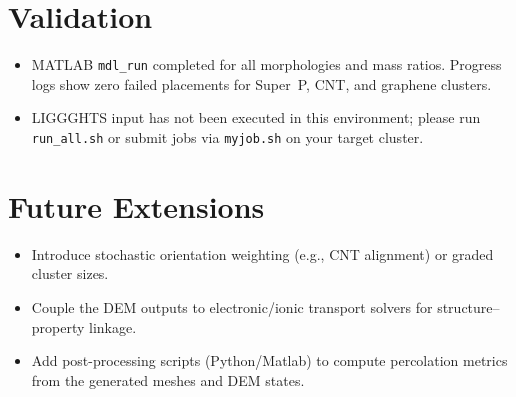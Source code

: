 \documentclass[11pt]{article}
\begin{document}
\section{Validation}
\begin{itemize}
    \item MATLAB \texttt{mdl\_run} completed for all morphologies and mass ratios. Progress logs show zero failed placements for Super~P, CNT, and graphene clusters.
    \item LIGGGHTS input has not been executed in this environment; please run \texttt{run\_all.sh} or submit jobs via \texttt{myjob.sh} on your target cluster.
\end{itemize}

\section{Future Extensions}
\begin{itemize}
    \item Introduce stochastic orientation weighting (e.g., CNT alignment) or graded cluster sizes.
    \item Couple the DEM outputs to electronic/ionic transport solvers for structure--property linkage.
    \item Add post-processing scripts (Python/Matlab) to compute percolation metrics from the generated meshes and DEM states.
\end{itemize}
\end{document}
